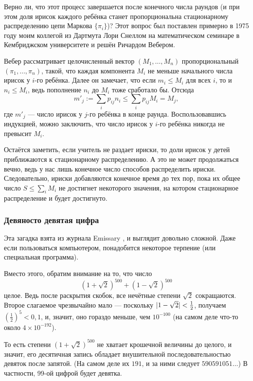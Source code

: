 Верно ли, что этот процесс завершается после конечного числа раундов
(и при этом доля ирисок каждого ребёнка станет пропорциональна стационарному распределению цепи Маркова $\{\pi_i\}$)?
Этот вопрос был поставлен примерно в 1975 году моим коллегой из Дартмута Лори Снеллом на математическом семинаре в Кембриджском университете и решён Ричардом Вебером.

Вебер рассматривает целочисленный вектор $(M_1, \dots , M_n)$ пропорциональный $(\pi_1, \dots , \pi_n)$, такой, что каждая компонента $M_i$ не меньше начального числа ирисок у $i$-го ребёнка.
Далее он замечает, что если $m_i \leqslant M_i$ для всех $i$, то и $n_i \leqslant M_i$, ведь пополнение $n_i$ до $M_i$ тоже сработало бы.
Отсюда 
\[m'_j
:=
\sum_i p_{ij} n_i
\leqslant
\sum_i p_{ij} M_i
=
M_j,\] где $m'_j$ --- число ирисок у $j$-го ребёнка в конце раунда.
Воспользовавшись индукцией, можно заключить, что число ирисок у $i$-го ребёнка никогда не превысит $M_i$.

Остаётся заметить, если учитель не раздает ириски, то доли ирисок у детей приближаются к стационарному распределению.
А это не может продолжаться вечно, ведь у нас лишь конечное число способов распределить ириски.
Следовательно, ириски добавляются конечное время до тех пор, пока их общее число $S\leqslant\sum_iM_i$ не достигнет некоторого значения, на котором стационарное распределение и будет достигнуто.

\subsubsection*{Девяносто девятая цифра}

Эта загадка взята из журнала Emissary \cite[осень 1999]{3}, и выглядит довольно сложной.
Даже если пользоваться компьютером, понадобится некоторое терпение (или специальная программа).

Вместо этого, обратим внимание на то, что число
\[(1+\sqrt{2})^{500}+(1-\sqrt{2})^{500}\]
целое.
Ведь после раскрытия скобок, все нечётные степени $\sqrt{2}$ сокращаются.
Второе слагаемое чрезвычайно мало --- поскольку $|1-\sqrt{2}|\z<\tfrac12$, получаем $(\tfrac12)^5<0{,}1$, и, значит, оно гораздо меньше, чем $10^{-100}$ (на самом деле что-то около $4 \times 10^{-192}$).

То есть степени $(1+\sqrt{2})^{500}$ не хватает крошечной величины до целого, и значит, его десятичная запись обладает внушительной последовательностью девяток после запятой.
(На самом деле их $191$, и за ними следует $590591051\dots$)
В частности, 99-ой цифрой будет девятка.

